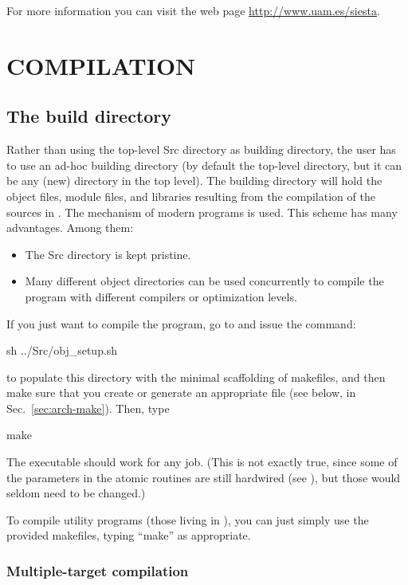 For more information you can visit the web page
\url{http://www.uam.es/siesta}.

\section{COMPILATION}

\subsection{The build directory}

Rather than using the top-level Src directory as building directory,
the user has to use an ad-hoc building directory (by default the
top-level  directory, but it can be any (new) directory in
the top level).  The building directory will hold the object files,
module files, and libraries resulting from the compilation of the
sources in .  The  mechanism of modern 
programs is used. This scheme has many advantages. Among them:

\begin{itemize}
\item The Src directory is kept pristine.
\item Many different object directories can be used concurrently to
  compile the program with different compilers or optimization levels.
\end{itemize}

If you just want to compile the program, go to  and issue the
command:
\begin{shellexample}
  sh ../Src/obj_setup.sh
\end{shellexample}
to populate this directory with the minimal scaffolding of makefiles,
and then make sure that you create or generate an appropriate 
file (see below, in Sec.~\ref{sec:arch-make}). Then, type
\begin{shellexample}
  make
\end{shellexample}
The executable should work for any job. (This is not exactly true,
since some of the parameters in the atomic routines are still
hardwired (see ), but those would seldom need to
be changed.)

To compile utility programs (those living in ), you can just
simply use the provided makefiles, typing ``make'' as appropriate.

\subsubsection{Multiple-target compilation}


